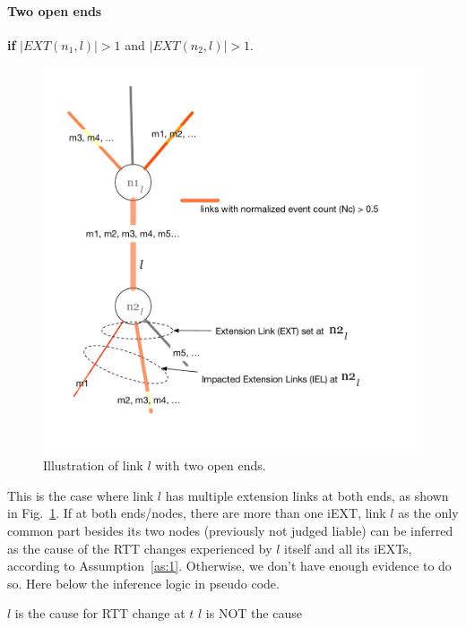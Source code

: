 \paragraph{Two open ends} \textbf{if} $|EXT(n_1, l)| >1$ and $|EXT(n_2, l)| > 1$.

\begin{figure}[!htb]
\centering
\includegraphics[width=.9\textwidth]{gfx/chap5/two_open_ends.pdf}
\caption{Illustration of link $l$ with two open ends.}
\label{fig:chap5_two_open_ends}
\end{figure}

This is the case where link $l$ has multiple extension links at both ends, as shown in Fig.~\ref{fig:chap5_two_open_ends}. 
If at both ends/nodes, there are more than one \ac{iEXT}, link $l$ as the only common part besides its two nodes (previously not judged liable) can be inferred as the cause of the RTT changes experienced by $l$ itself and all its \acp{iEXT}, according to Assumption~\ref{as:1}.
Otherwise, we don't have enough evidence to do so. Here below the inference logic in pseudo code.

\begin{algorithmic}
\State $l$ is the cause for RTT change at $t$ 
\Else
\State $l$ is NOT the cause
\EndIf
\end{algorithmic}


